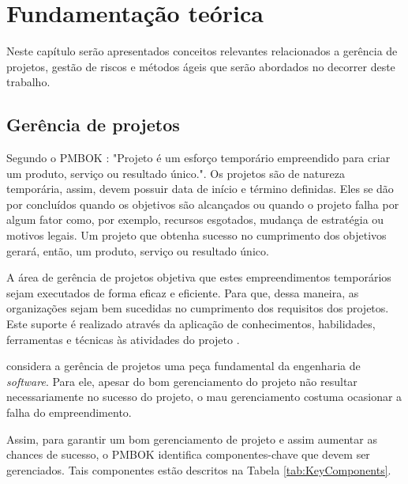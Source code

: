\documentclass[
    12pt,       %
    openright,      %
    twoside,      %
    a4paper,      %
    english,      %
    french,       %
    spanish,      %
    brazil,       %
    ]{abntex2}
\begin{document}
\chapter{Fundamentação teórica}
\label{sec:Fundamentacao}

Neste capítulo serão apresentados conceitos relevantes relacionados a gerência de projetos, gestão de riscos e métodos ágeis que serão abordados no decorrer deste trabalho.

\section{Gerência de projetos}

Segundo o PMBOK \cite{PMBOK:2017}: "Projeto é um esforço temporário empreendido para criar um produto, serviço ou resultado único.". Os projetos são de natureza temporária, assim, devem possuir data de início e término definidas. Eles se dão por concluídos quando os objetivos são alcançados ou quando o projeto falha por algum fator como, por exemplo, recursos esgotados, mudança de estratégia ou motivos legais. Um projeto que obtenha sucesso no cumprimento dos objetivos gerará, então, um produto, serviço ou resultado único. 

A área de gerência de projetos objetiva que estes empreendimentos temporários sejam executados de forma eficaz e eficiente. Para que, dessa maneira, as organizações sejam bem sucedidas no cumprimento dos requisitos dos projetos. Este suporte é realizado através da aplicação de conhecimentos, habilidades, ferramentas e técnicas às atividades do projeto \cite{PMBOK:2017}. 

 considera a gerência de projetos uma peça fundamental da engenharia de \textit{software}. Para ele, apesar do bom gerenciamento do projeto não resultar necessariamente no sucesso do projeto, o mau gerenciamento costuma ocasionar a falha do empreendimento. 

Assim, para garantir um bom gerenciamento de projeto e assim aumentar as chances de sucesso, o PMBOK \cite{PMBOK:2017} identifica componentes-chave que devem ser gerenciados. Tais componentes estão descritos na Tabela \ref{tab:KeyComponents}.
\end{document}
